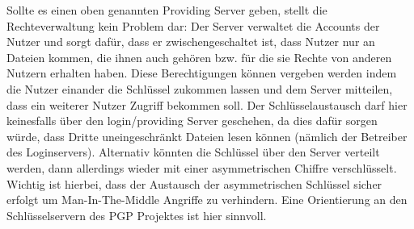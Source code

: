 \documentclass[12pt,a4paper,bibliography=totocnumbered,listof=totocnumbered]{scrartcl}
\begin{document}
Sollte es einen oben genannten Providing Server geben, stellt die Rechteverwaltung kein Problem dar: Der Server verwaltet die Accounts der Nutzer und sorgt dafür, dass er zwischengeschaltet ist, dass Nutzer nur an Dateien kommen, die ihnen auch gehören bzw. für die sie Rechte von anderen Nutzern erhalten haben. Diese Berechtigungen können vergeben werden indem die Nutzer einander die Schlüssel zukommen lassen und dem Server mitteilen, dass ein weiterer Nutzer Zugriff bekommen soll. Der Schlüsselaustausch darf hier keinesfalls über den login/providing Server geschehen, da dies dafür sorgen würde, dass Dritte uneingeschränkt Dateien lesen können (nämlich der Betreiber des Loginservers). Alternativ könnten die Schlüssel über den Server verteilt werden, dann allerdings wieder mit einer asymmetrischen Chiffre verschlüsselt. Wichtig ist hierbei, dass der Austausch der asymmetrischen Schlüssel sicher erfolgt um Man-In-The-Middle Angriffe zu verhindern. Eine Orientierung an den Schlüsselservern des PGP Projektes ist hier sinnvoll.
\end{document}
